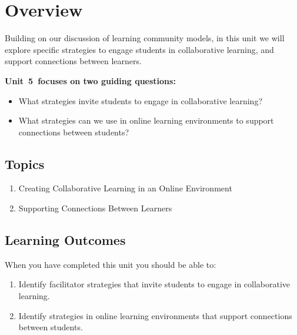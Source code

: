 \documentclass[
]{book}
\providecommand{\tightlist}{%
  \setlength{\itemsep}{0pt}\setlength{\parskip}{0pt}}
\begin{document}
\hypertarget{overview-4}{%
\section*{Overview}\label{overview-4}}

Building on our discussion of learning community models, in this unit we will explore specific strategies to engage students in collaborative learning, and support connections between learners.

\textbf{Unit~5~focuses on two guiding questions:}

\begin{itemize}
\tightlist
\item
  What strategies invite students to engage in collaborative learning?\\
\item
  What strategies can we use in online learning environments to support connections between students?
\end{itemize}

\hypertarget{topics-4}{%
\subsection*{Topics}\label{topics-4}}

\begin{enumerate}
\def\labelenumi{\arabic{enumi}.}
\tightlist
\item
  Creating Collaborative Learning in an Online Environment\\
\item
  Supporting Connections Between Learners
\end{enumerate}

\hypertarget{learning-outcomes-4}{%
\subsection*{Learning Outcomes}\label{learning-outcomes-4}}

When you have completed this unit you should be able to:

\begin{enumerate}
\def\labelenumi{\arabic{enumi}.}
\tightlist
\item
  Identify facilitator strategies that invite students to engage in collaborative learning.\\
\item
  Identify strategies in online learning environments that support connections between students.
\end{enumerate}
\end{document}

